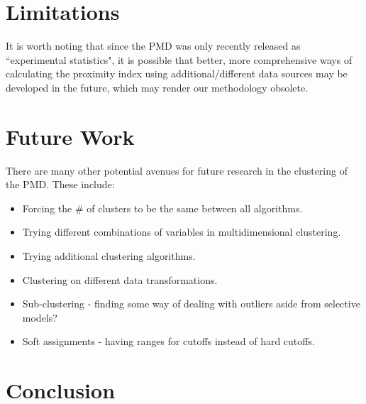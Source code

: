 \documentclass[11pt, a4paper]{article}
\begin{document}
\pagebreak 
\section{Limitations}


It is worth noting that since the PMD was only recently released as ``experimental statistics", it is possible that better, more comprehensive ways of calculating the proximity index using additional/different data sources may be developed in the future, which may render our methodology obsolete. 










\section{Future Work}



There are many other potential avenues for future research in the clustering of the PMD. These include:
\begin{itemize}
\item Forcing the \# of clusters to be the same between all algorithms. 
\item Trying different combinations of variables in multidimensional clustering.
\item Trying additional clustering algorithms. 
\item Clustering on different data transformations. 
\item Sub-clustering - finding some way of dealing with outliers aside from selective models?
\item Soft assignments - having ranges for cutoffs instead of hard cutoffs. 
\end{itemize}









\pagebreak 
\section{Conclusion}
\end{document}
